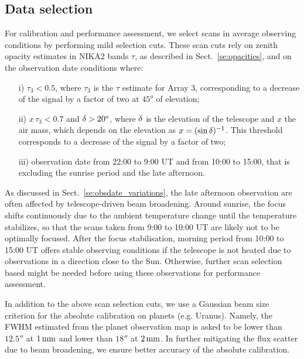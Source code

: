 


\subsection{Data selection}%
\label{se:data_selection}

For calibration and performance assessment, we select scans in average
observing conditions by performing mild selection cuts. These scan
cuts rely on zenith opacity estimates in NIKA2 bands $\tau$, as
described in Sect.~\ref{se:opacities}, and on the observation date
conditions where:
%
\begin{itemize}
\item[i)] $\tau_{3} < 0.5$, where $\tau_{3}$ is the $\tau$ estimate for
  Array 3, corresponding to a decrease of the signal by a factor of
  two at $45^{o}$ of elevation;
\item[ii)] $x\, \tau_{3} < 0.7$ and $\delta > 20^{o}$, where $\delta$ is the
  elevation of the telescope and $x$ the
  air mass, which depends on the elevation as $x=(\sin{\delta})^{-1}$. This
  threshold corresponds to a decrease of the signal by a factor of two;
\item[iii)] observation date from 22:00 to 9:00 UT and from 10:00 to
  15:00, that is excluding the sunrise period and the late afternoon.
\end{itemize}
%
As discussed in Sect.~\ref{se:obsdate_variations}, the late afternoon
observation are often affected by telescope-driven beam broadening. Around
sunrise, the focus shifts continuously due to the ambient temperature
change until the temperature stabilizes, so that the scans taken from
9:00 to 10:00 UT are likely not to be optimally focused.
After the focus stabilisation, morning period 
from 10:00 to 15:00 UT offers stable observing conditions
if the telescope is not heated due to observations in a
direction close to the Sun. Otherwise, further scan selection based  might be needed before using these
observations for performance assessment.

   
In addition to the above scan selection cuts, we use a Gaussian beam
size criterion for the absolute calibration on planets
(e.g. Uranus). Namely, the FWHM estimated from the planet observation
map is asked to be lower than $12.5''$ at $1\,\rm{mm}$ and lower than $18''$ at
$2\,\rm{mm}$. In further mitigating the flux scatter due to beam broadening, we
ensure better accuracy of the absolute calibration.  




